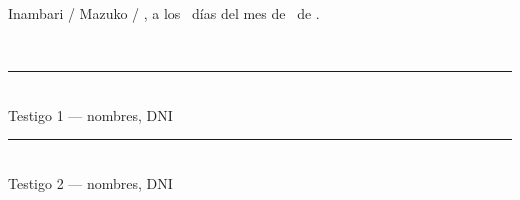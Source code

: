 \documentclass[12pt,a4paper]{article}
\begin{document}
\vspace{0.5em}
\noindent Inambari / Mazuko / \LugarOtorgamiento, a los \linea[1.6cm]\ días del mes de \linea[3.2cm]\ de \AnioOtorgamiento.

\vspace{0.35em}

\vspace{0.6em}
\\[0.2em]
\noindent
\begin{minipage}[t]{0.48\textwidth}
\centering
\vspace{1.1cm}
{\color{tinta}\rule{0.92\textwidth}{0.45pt}}\\[0.2em]
{\small Testigo 1 --- nombres, DNI}
\end{minipage}
\hfill
\begin{minipage}[t]{0.48\textwidth}
\centering
\vspace{1.1cm}
{\color{tinta}\rule{0.92\textwidth}{0.45pt}}\\[0.2em]
{\small Testigo 2 --- nombres, DNI}
\end{minipage}
\end{document}
